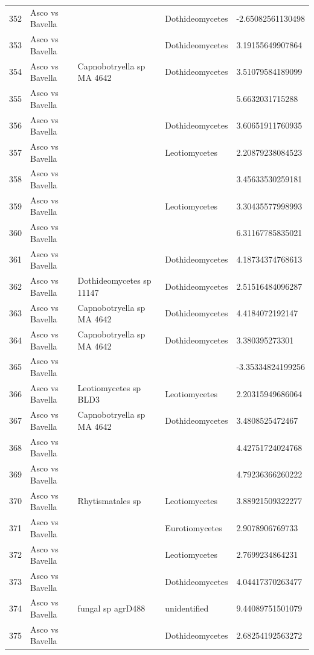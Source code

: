 \documentclass[12pt]{article}\usepackage[]{graphicx}\usepackage[]{color}
\numberwithin{figure}{section}
\begin{document}
\begin{table}[ht]
\begin{tabular}{lllll}
  352 & Asco vs Bavella &  & Dothideomycetes & -2.65082561130498 \\ 
  353 & Asco vs Bavella &  & Dothideomycetes & 3.19155649907864 \\ 
  354 & Asco vs Bavella & Capnobotryella sp MA 4642 & Dothideomycetes & 3.51079584189099 \\ 
  355 & Asco vs Bavella &  &  & 5.6632031715288 \\ 
  356 & Asco vs Bavella &  & Dothideomycetes & 3.60651911760935 \\ 
  357 & Asco vs Bavella &  & Leotiomycetes & 2.20879238084523 \\ 
  358 & Asco vs Bavella &  &  & 3.45633530259181 \\ 
  359 & Asco vs Bavella &  & Leotiomycetes & 3.30435577998993 \\ 
  360 & Asco vs Bavella &  &  & 6.31167785835021 \\ 
  361 & Asco vs Bavella &  & Dothideomycetes & 4.18734374768613 \\ 
  362 & Asco vs Bavella & Dothideomycetes sp 11147 & Dothideomycetes & 2.51516484096287 \\ 
  363 & Asco vs Bavella & Capnobotryella sp MA 4642 & Dothideomycetes & 4.4184072192147 \\ 
  364 & Asco vs Bavella & Capnobotryella sp MA 4642 & Dothideomycetes & 3.380395273301 \\ 
  365 & Asco vs Bavella &  &  & -3.35334824199256 \\ 
  366 & Asco vs Bavella & Leotiomycetes sp BLD3 & Leotiomycetes & 2.20315949686064 \\ 
  367 & Asco vs Bavella & Capnobotryella sp MA 4642 & Dothideomycetes & 3.4808525472467 \\ 
  368 & Asco vs Bavella &  &  & 4.42751724024768 \\ 
  369 & Asco vs Bavella &  &  & 4.79236366260222 \\ 
  370 & Asco vs Bavella & Rhytismatales sp & Leotiomycetes & 3.88921509322277 \\ 
  371 & Asco vs Bavella &  & Eurotiomycetes & 2.9078906769733 \\ 
  372 & Asco vs Bavella &  & Leotiomycetes & 2.7699234864231 \\ 
  373 & Asco vs Bavella &  & Dothideomycetes & 4.04417370263477 \\ 
  374 & Asco vs Bavella & fungal sp agrD488 & unidentified & 9.44089751501079 \\ 
  375 & Asco vs Bavella &  & Dothideomycetes & 2.68254192563272 \\ 

\end{tabular}
\end{table}
\end{document}
